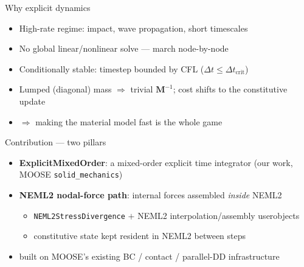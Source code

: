\documentclass[aspectratio=169,11pt]{beamer}
\begin{document}
\begin{frame}{Why explicit dynamics}
\begin{itemize}
  \item High-rate regime: impact, wave propagation, short timescales
  \item No global linear/nonlinear solve --- march node-by-node
  \item Conditionally stable: timestep bounded by CFL ($\Delta t \le \Delta t_{\mathrm{crit}}$)
  \item Lumped (diagonal) mass $\Rightarrow$ trivial $\mathbf{M}^{-1}$; cost shifts to the constitutive update
  \item $\Rightarrow$ making the material model fast is the whole game
\end{itemize}
\end{frame}

\begin{frame}{Contribution --- two pillars}
\begin{itemize}
  \item[\textcolor{nblue}{\textbf{1.}}] \textcolor{nblue}{\textbf{ExplicitMixedOrder}}: a mixed-order explicit time integrator (our work, MOOSE \texttt{solid\_mechanics})
  \item[\textcolor{nblue}{\textbf{2.}}] \textcolor{nblue}{\textbf{NEML2 nodal-force path}}: internal forces assembled \emph{inside} NEML2
  \begin{itemize}
    \item \texttt{NEML2StressDivergence} $+$ NEML2 interpolation/assembly userobjects
    \item constitutive state kept resident in NEML2 between steps
  \end{itemize}
  \item[\textcolor{ngreen}{$\hookrightarrow$}] built on MOOSE's existing BC / contact / parallel-DD infrastructure
\end{itemize}
\end{frame}
\end{document}
